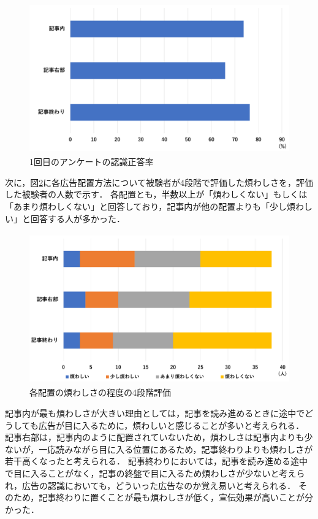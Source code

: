 \documentclass[12pt,a4j,titlepage]{ltjsarticle}
\begin{document}
\begin{figure}[H]
\begin{center}
 \includegraphics[height=65mm]{figures/広告認識正答率_1.pdf}
\end{center}
 \caption{1回目のアンケートの認識正答率}
 \label{fig:広告認識正答率_1}
\end{figure}

次に，図\ref{fig:煩わしさ_1}に各広告配置方法について被験者が4段階で評価した煩わしさを，評価した被験者の人数で示す．
各配置とも，半数以上が「煩わしくない」もしくは「あまり煩わしくない」と回答しており，記事内が他の配置よりも「少し煩わしい」と回答する人が多かった．

\begin{figure}[H]
\begin{center}
 \includegraphics[height=65mm]{figures/煩わしさ_1.pdf}
\end{center}
 \caption{各配置の煩わしさの程度の4段階評価}
 \label{fig:煩わしさ_1}
\end{figure}

記事内が最も煩わしさが大きい理由としては，記事を読み進めるときに途中でどうしても広告が目に入るために，煩わしいと感じることが多いと考えられる．
記事右部は，記事内のように配置されていないため，煩わしさは記事内よりも少ないが，一応読みながら目に入る位置にあるため，記事終わりよりも煩わしさが若干高くなったと考えられる．
記事終わりにおいては，記事を読み進める途中で目に入ることがなく，記事の終盤で目に入るため煩わしさが少ないと考えられ，広告の認識においても，どういった広告なのか覚え易いと考えられる．
そのため，記事終わりに置くことが最も煩わしさが低く，宣伝効果が高いことが分かった．
\end{document}
